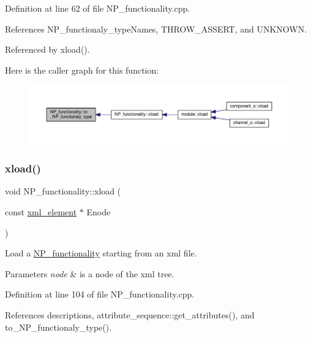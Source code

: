 Definition at line 62 of file N\+P\+\_\+functionality.\+cpp.



References N\+P\+\_\+functionaly\+\_\+type\+Names, T\+H\+R\+O\+W\+\_\+\+A\+S\+S\+E\+RT, and U\+N\+K\+N\+O\+WN.



Referenced by xload().

Here is the caller graph for this function\+:
\nopagebreak
\begin{figure}[H]
\begin{center}
\leavevmode
\includegraphics[width=350pt]{d8/dda/classNP__functionality_a788fc254520907f4c8ef0d4182f7cc79_icgraph}
\end{center}
\end{figure}
\mbox{\label{classNP__functionality_a735fea35a9e8c0fa66f447bd5040e84e}} 
\subsubsection{\texorpdfstring{xload()}{xload()}}
{\footnotesize\ttfamily void N\+P\+\_\+functionality\+::xload (\begin{DoxyParamCaption}\item[{const \hyperlink{classxml__element}{xml\+\_\+element} $\ast$}]{Enode }\end{DoxyParamCaption})}



Load a \hyperlink{classNP__functionality}{N\+P\+\_\+functionality} starting from an xml file. 


\begin{DoxyParams}{Parameters}
{\em node} & is a node of the xml tree. \\
\hline
\end{DoxyParams}


Definition at line 104 of file N\+P\+\_\+functionality.\+cpp.



References descriptions, attribute\+\_\+sequence\+::get\+\_\+attributes(), and to\+\_\+\+N\+P\+\_\+functionaly\+\_\+type().



